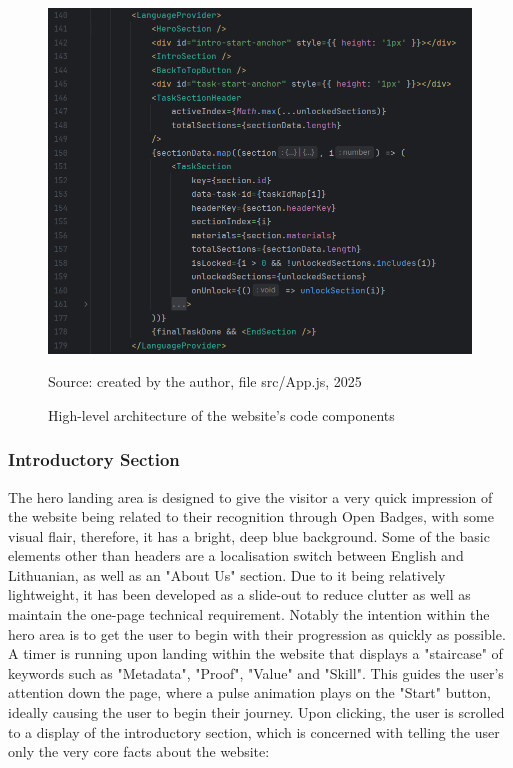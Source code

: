 \begin{figure}[htbp]
 \centering
 \includegraphics[width=14cm]{Media/app_composition.png}
 \caption{High-level architecture of the website's code components}
 \label{fig:app_composition}
 {\raggedright \small{Source: created by the author, file src/App.js, 2025}\par}
\end{figure}

\subsubsection{Introductory Section}
The hero landing area is designed to give the visitor a very quick impression of the website being related to their recognition through Open Badges, with some visual flair, therefore, it has a bright, deep blue background. 
Some of the basic elements other than headers are a localisation switch between English and Lithuanian, as well as an "About Us" section. 
Due to it being relatively lightweight, it has been developed as a slide-out to reduce clutter as well as maintain the one-page technical requirement. 
Notably the intention within the hero area is to get the user to begin with their progression as quickly as possible. 
A timer is running upon landing within the website that displays a "staircase" of keywords such as "Metadata", "Proof", "Value" and "Skill". 
This guides the user's attention down the page, where a pulse animation plays on the "Start" button, ideally causing the user to begin their journey. 
Upon clicking, the user is scrolled to a display of the introductory section, which is concerned with telling the user only the very core facts about the website:

